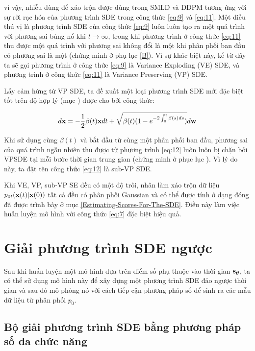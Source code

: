 \documentclass{article} %
\begin{document}
vì vậy, nhiễu dùng để xáo trộn được dùng trong SMLD và DDPM tương ứng với sự rời rạc hóa của phương trình SDE trong công thức \ref{eq:9} và \ref{eq:11}.
Một điều thú vị là phương trình SDE của công thức \ref{eq:9} luôn luôn tạo ra một quá trình với phương sai bùng nổ khi $t \rightarrow \infty$, trong khi phương trình ở công thức \ref{eq:11} thu được một quá trình với phương sai không đổi là một khi phân phối ban đầu có phương sai là một (chứng minh ở phụ lục \ref{B}).
Vì sự khác biệt này, kể từ đây ta sẽ gọi phương trình ở công thức \ref{eq:9} là Variance Exploding (VE) SDE, và phương trình ở công thức \ref{eq:11} là Variance Preserving (VP) SDE.

Lấy cảm hứng từ VP SDE, ta đề xuất một loại phương trình SDE mới đặc biệt tốt trên độ hợp lý (mục ) được cho bởi công thức:

\begin{equation} \label{eq:12}
    d \bold{x} = -\dfrac{1}{2} \beta(t) \bold{x} dt + \sqrt{\beta(t) (1-e^{-2\int_{0}^{t} \beta(s)ds} )} d \bold{w}
\end{equation}

Khi sử dụng cùng $\beta(t)$ và bắt đầu từ cùng một phân phối ban đầu, phương sai của quá trình ngẫu nhiên thu được từ phương trình \ref{eq:12} luôn luôn bị chặn bởi VPSDE tại mỗi bước thời gian trung gian (chứng minh ở phục lục ).
Vì lý do này, ta đặt tên công thức \ref{eq:12} là sub-VP SDE.

Khi VE, VP, sub-VP SE đều có một độ trôi, nhân làm xáo trộn dữ liệu $p_{0t}(\bold{x}(t) \vert \bold{x}(0))$ tất cả đều có phân phối Gaussian và có thể được tính ở dạng đóng đã được trình bày ở mục \ref{Estimating-Scores-For-The-SDE}.
Điều này làm việc huấn luyện mô hình với công thức \ref{eq:7} đặc biệt hiệu quả.

\section{Giải phương trình SDE ngược}

Sau khi huấn luyện một mô hình dựa trên điểm số phụ thuộc vào thời gian $\bold{s}_{\boldsymbol{\theta}}$, ta có thể sử dụng mô hình này để xây dựng một phương trình SDE đảo ngược thời gian và sau đó mô phỏng nó với cách tiếp cận phương pháp số để sinh ra các mẫu dữ liệu từ phân phối $p_0$.

\subsection{Bộ giải phương trình SDE bằng phương pháp số đa chức năng}
\end{document}
